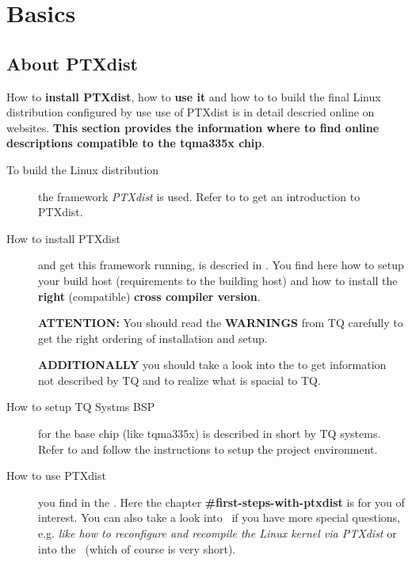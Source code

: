 \chapter{Basics}%


\label{cha:Basics_and_general_information}
\section{About PTXdist}%
\label{sec:linux_distribution_build}

How to \textbf{install PTXdist}, how to \textbf{use it} and how to to build the
final Linux distribution configured by use use of PTXdist is in detail descried
online on websites. \textbf{This section provides the information where to find
    online descriptions compatible to the tqma335x chip}.

\begin{description}
    \item[To build the Linux distribution] the framework \textit{PTXdist} is
        used. Refer to \newline \textbf{\cite{ptxdist}} to get an introduction
        to PTXdist.
    \item[How to install PTXdist] and get this framework running, is descried in
        \textbf{\cite{tq_bsp119_install}}. You find here how to setup your
        build host (requirements to the building host) and how to install the
        \textbf{right} (compatible) \textbf{cross compiler version}.

        \textbf{ATTENTION:} You should read the \textbf{WARNINGS} from TQ
        carefully to get the right ordering of installation and setup.

        \textbf{ADDITIONALLY} you should take a look into the
        \textbf{\cite[PTXdist installation guide]{ptxdist_install} }
        to get information not described by TQ and to realize what is spacial
        to TQ.\@
    \item[How to setup TQ Systms BSP] for the base chip (like tqma335x)
        is described in short by TQ systems. Refer to
        \textbf{\cite{tq_bsp119_configuration}} and follow the instructions to
        setup the project environment.

    \item[How to use PTXdist] you find in the
        \textbf{\cite[PTXdist user manual]{ptxdist_manual}}. Here the chapter
        \textbf{\#first-steps-with-ptxdist} is for you of interest. You can also
        take a look into~\cite{ptxdist_developer} if you have more special
        questions, e.g. \textit{like how to reconfigure and recompile the Linux
        kernel via PTXdist} or into the~\cite[PTXdist FAQ list]{ptxdist_faq}
        (which of course is very short).


\end{description}
